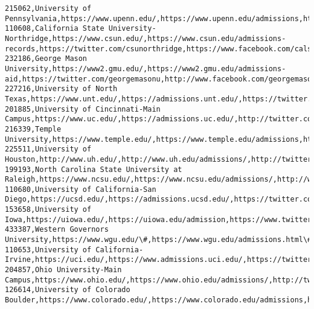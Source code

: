 \documentclass[11pt]{article}
\begin{document}
\begin{Verbatim}[commandchars=\\\{\}]
215062,University of Pennsylvania,https://www.upenn.edu/,https://www.upenn.edu/admissions,http://twitter.com/Penn,https://www.facebook.com/UnivPennsylvania,http://instagram.com/uofpenn
110608,California State University-Northridge,https://www.csun.edu/,https://www.csun.edu/admissions-records,https://twitter.com/csunorthridge,https://www.facebook.com/calstatenorthridge,https://www.instagram.com/csun\_edu/
232186,George Mason University,https://www2.gmu.edu/,https://www2.gmu.edu/admissions-aid,https://twitter.com/georgemasonu,http://www.facebook.com/georgemason,https://instagram.com/georgemasonu
227216,University of North Texas,https://www.unt.edu/,https://admissions.unt.edu/,https://twitter.com/UNTsocial,https://www.facebook.com/northtexas,https://www.instagram.com/UNT/
201885,University of Cincinnati-Main Campus,https://www.uc.edu/,https://admissions.uc.edu/,http://twitter.com/UofCincy,http://www.facebook.com/uofcincinnati,http://instagram.com/uofcincy
216339,Temple University,https://www.temple.edu/,https://www.temple.edu/admissions,https://twitter.com/templeuniv,https://www.facebook.com/templeu,https://instagram.com/templeuniv
225511,University of Houston,http://www.uh.edu/,http://www.uh.edu/admissions/,http://twitter.com/UHouston,http://www.facebook.com/universityofhouston,http://instagram.com/universityofhouston
199193,North Carolina State University at Raleigh,https://www.ncsu.edu/,https://www.ncsu.edu/admissions/,http://www.twitter.com/ncstate/,https://www.facebook.com/ncstate,http://instagram.com/ncstate
110680,University of California-San Diego,https://ucsd.edu/,https://admissions.ucsd.edu/,https://twitter.com/ucsandiego/,https://www.facebook.com/UCSanDiego/,https://www.instagram.com/ucsandiego/
153658,University of Iowa,https://uiowa.edu/,https://uiowa.edu/admission,https://www.twitter.com/uiowa,https://www.facebook.com/universityofiowa,https://www.instagram.com/uiowa
433387,Western Governors University,https://www.wgu.edu/\#,https://www.wgu.edu/admissions.html\#,https://twitter.com/wgu,https://www.facebook.com/wgu.edu/,https://www.instagram.com/westerngovernorsu/
110653,University of California-Irvine,https://uci.edu/,https://www.admissions.uci.edu/,https://twitter.com/ucirvine,https://www.facebook.com/UCIrvine,http://instagram.com/ucirvine
204857,Ohio University-Main Campus,https://www.ohio.edu/,https://www.ohio.edu/admissions/,http://twitter.com/ohiou/,http://www.facebook.com/OhioUniversity/,https://instagram.com/ohiouadmissions/
126614,University of Colorado Boulder,https://www.colorado.edu/,https://www.colorado.edu/admissions,http://www.twitter.com/cuboulder,http://www.facebook.com/cuboulder,http://instagram.com/cuboulder

\end{Verbatim}
\end{document}
